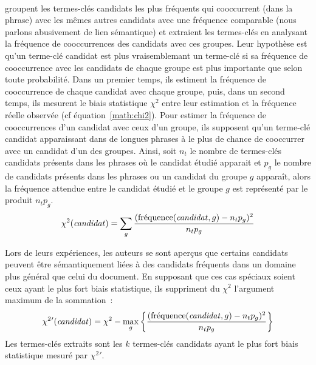        ~\\ groupent les termes-clés
        candidats les plus fréquents qui cooccurrent (dans la phrase) avec les
        mêmes autres candidats avec une fréquence comparable (nous parlons
        abusivement de lien sémantique) et extraient les termes-clés en
        analysant la fréquence de cooccurrences des candidats avec ces groupes.
        Leur hypothèse est qu'un terme-clé candidat est plus vraisemblemant un
        terme-clé si sa fréquence de cooccurrence avec les candidats de chaque
        groupe est plus importante que selon toute probabilité. Dans un premier
        temps, ils estiment la fréquence de cooccurrence de chaque candidat avec
        chaque groupe, puis, dans un second temps, ils mesurent le biais
        statistique $\chi^2$ entre leur estimation et la fréquence réelle
        observée (cf équation~\ref{math:chi2}). Pour estimer la fréquence de
        cooccurrences d'un candidat avec ceux d'un groupe, ils supposent qu'un
        terme-clé candidat apparaissant dans de longues phrases à le plus de
        chance de cooccurrer avec un candidat d'un des groupes. Ainsi, soit
        $n_t$ le nombre de termes-clés candidats présents dans les phrases où le
        candidat étudié apparait et $p_g$ le nombre de candidats présents dans
        les phrases ou un candidat du groupe $g$ apparaît, alors la fréquence
        attendue entre le candidat étudié et le groupe $g$ est représenté par le
        produit $n_tp_g$.
        \begin{align}
          \chi^2(\text{\textit{candidat}}) = \sum_{g} \frac{(\text{fréquence}(\text{\textit{candidat}}, g) - n_tp_g)^2}{n_tp_g} \label{math:chi2}
        \end{align}
        
        Lors de leurs expériences, les auteurs se sont aperçus que certains
        candidats peuvent être sémantiquement liées à des candidats fréquents
        dans un domaine plus général que celui du document. En supposant que ces
        cas spéciaux soient ceux ayant le plus fort biais statistique, ils
        suppriment du $\chi^2$ l'argument maximum de la sommation~:
        \begin{align}
          \chi^2{'}(\text{\textit{candidat}}) = \chi^2 - \max_{g}\left\{\frac{(\text{fréquence}(\text{\textit{candidat}}, g) - n_tp_g)^2}{n_tp_g}\right\}
        \end{align}
        Les termes-clés extraits sont les $k$ termes-clés candidats ayant le
        plus fort biais statistique mesuré par $\chi^2{'}$.

